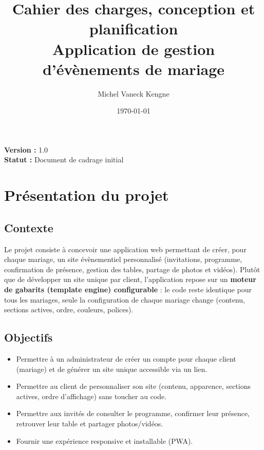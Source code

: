 \documentclass[11pt,a4paper]{article}
\title{\color{primaryblue}\textbf{Cahier des charges, conception et planification\\
Application de gestion d'évènements de mariage}}
\author{Michel Vaneck Kengne}
\date{\today}
\begin{document}
\maketitle
\thispagestyle{empty}

\vspace{1cm}
\noindent\textbf{Version :} 1.0 \\
\textbf{Statut :} Document de cadrage initial

\newpage
\tableofcontents
\newpage

\section{Présentation du projet}

\subsection{Contexte}
Le projet consiste à concevoir une application web permettant de créer, pour chaque
mariage, un site évènementiel personnalisé (invitations, programme, confirmation de
présence, gestion des tables, partage de photos et vidéos). Plutôt que de développer
un site unique par client, l'application repose sur un \textbf{moteur de gabarits
(template engine) configurable} : le code reste identique pour tous les mariages,
seule la configuration de chaque mariage change (contenu, sections actives, ordre,
couleurs, polices).

\subsection{Objectifs}
\begin{itemize}[leftmargin=1.2cm]
  \item Permettre à un administrateur de créer un compte pour chaque client (mariage)
        et de générer un site unique accessible via un lien.
  \item Permettre au client de personnaliser son site (contenu, apparence, sections
        actives, ordre d'affichage) sans toucher au code.
  \item Permettre aux invités de consulter le programme, confirmer leur présence,
        retrouver leur table et partager photos/vidéos.
  \item Fournir une expérience responsive et installable (PWA).
\end{itemize}
\end{document}
